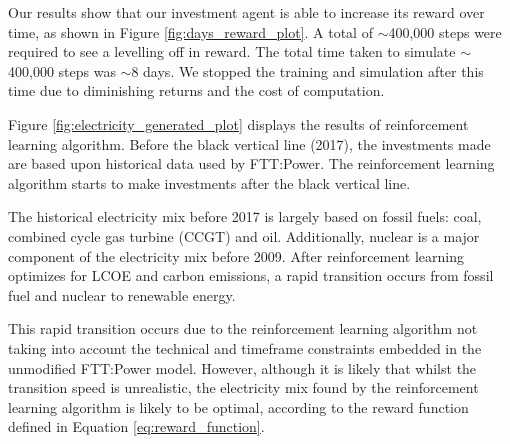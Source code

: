 \documentclass{article}
\begin{document}
Our results show that our investment agent is able to increase its reward over time, as shown in Figure \ref{fig:days_reward_plot}. A total of ${\sim}$400,000 steps were required to see a levelling off in reward. The total time taken to simulate ${\sim}$400,000 steps was ${\sim}$8 days. We stopped the training and simulation after this time due to diminishing returns and the cost of computation.

Figure \ref{fig:electricity_generated_plot} displays the results of reinforcement learning algorithm. Before the black vertical line (2017), the investments made are based upon historical data used by FTT:Power. The reinforcement learning algorithm starts to make investments after the black vertical line. 


The historical electricity mix before 2017 is largely based on fossil fuels: coal, combined cycle gas turbine (CCGT) and oil. Additionally, nuclear is a major component of the electricity mix before 2009. After reinforcement learning optimizes for LCOE and carbon emissions, a rapid transition occurs from fossil fuel and nuclear to renewable energy. 

This rapid transition occurs due to the reinforcement learning algorithm not taking into account the technical and timeframe constraints embedded in the unmodified FTT:Power model. However, although it is likely that whilst the transition speed is unrealistic, the electricity mix found by the reinforcement learning algorithm is likely to be optimal, according to the reward function defined in Equation \ref{eq:reward_function}.



\end{document}
